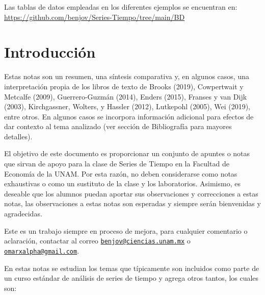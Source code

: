 \documentclass[
]{book}
\begin{document}
Las tablas de datos empleadas en los diferentes ejemplos se encuentran en: \url{https://github.com/benjov/Series-Tiempo/tree/main/BD}

\hypertarget{introducciuxf3n}{%
\chapter{Introducción}\label{introducciuxf3n}}

Estas notas son un resumen, una síntesis comparativa y, en algunos casos, una interpretación propia de los libros de texto de Brooks (2019), Cowpertwait y Metcalfe (2009), Guerrero-Guzmán (2014), Enders (2015), Franses y van Dijk (2003), Kirchgassner, Wolters, y Hassler (2012), Lutkepohl (2005), Wei (2019), entre otros. En algunos casos se incorpora información adicional para efectos de dar contexto al tema analizado (ver sección de Bibliografía para mayores detalles).

El objetivo de este documento es proporcionar un conjunto de apuntes o notas que sirvan de apoyo para la clase de Series de Tiempo en la Facultad de Economía de la UNAM. Por esta razón, no deben considerarse como notas exhaustivas o como un sustituto de la clase y los laboratorios. Asimismo, es deseable que los alumnos puedan aportar sus observaciones y correcciones a estas notas, las observaciones a estas notas son esperadas y siempre serán bienvenidas y agradecidas.

Este es un trabajo siempre en proceso de mejora, para cualquier comentario o aclaración, contactar al correo \href{mailto:benjov@ciencias.unam.mx}{\nolinkurl{benjov@ciencias.unam.mx}} o \href{mailto:omarxalpha@gmail.com}{\nolinkurl{omarxalpha@gmail.com}}.

En estas notas se estudian los temas que típicamente son incluidos como parte de un curso estándar de análisis de series de tiempo y agrega otros tantos, los cuales son:
\end{document}
